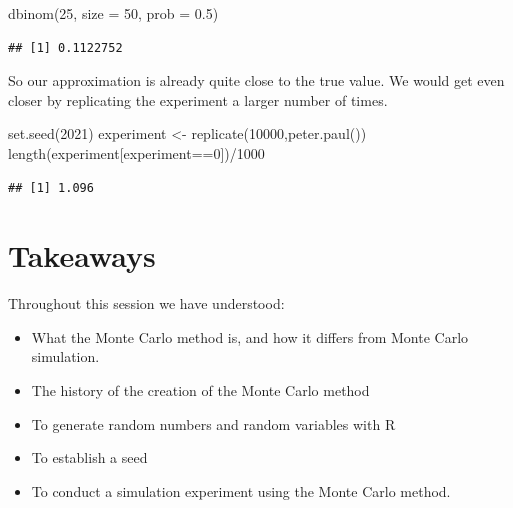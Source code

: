 \documentclass[
]{book}
\newenvironment{Shaded}{\begin{snugshade}}{\end{snugshade}}
\newcommand{\AttributeTok}[1]{\textcolor[rgb]{0.77,0.63,0.00}{#1}}
\newcommand{\DecValTok}[1]{\textcolor[rgb]{0.00,0.00,0.81}{#1}}
\newcommand{\FloatTok}[1]{\textcolor[rgb]{0.00,0.00,0.81}{#1}}
\newcommand{\FunctionTok}[1]{\textcolor[rgb]{0.00,0.00,0.00}{#1}}
\newcommand{\NormalTok}[1]{#1}
\newcommand{\OtherTok}[1]{\textcolor[rgb]{0.56,0.35,0.01}{#1}}
\newcommand{\SpecialCharTok}[1]{\textcolor[rgb]{0.00,0.00,0.00}{#1}}
\providecommand{\tightlist}{%
  \setlength{\itemsep}{0pt}\setlength{\parskip}{0pt}}
\theoremstyle{definition}
\theoremstyle{definition}
\theoremstyle{definition}
\theoremstyle{definition}
\theoremstyle{remark}
\begin{document}
\begin{Shaded}
\begin{Highlighting}[]
\FunctionTok{dbinom}\NormalTok{(}\DecValTok{25}\NormalTok{, }\AttributeTok{size =} \DecValTok{50}\NormalTok{, }\AttributeTok{prob =} \FloatTok{0.5}\NormalTok{)}
\end{Highlighting}
\end{Shaded}

\begin{verbatim}
## [1] 0.1122752
\end{verbatim}

So our approximation is already quite close to the true value. We would get even closer by replicating the experiment a larger number of times.

\begin{Shaded}
\begin{Highlighting}[]
\FunctionTok{set.seed}\NormalTok{(}\DecValTok{2021}\NormalTok{)}
\NormalTok{experiment }\OtherTok{\textless{}{-}} \FunctionTok{replicate}\NormalTok{(}\DecValTok{10000}\NormalTok{,}\FunctionTok{peter.paul}\NormalTok{())}
\FunctionTok{length}\NormalTok{(experiment[experiment}\SpecialCharTok{==}\DecValTok{0}\NormalTok{])}\SpecialCharTok{/}\DecValTok{1000}
\end{Highlighting}
\end{Shaded}

\begin{verbatim}
## [1] 1.096
\end{verbatim}

\hypertarget{takeaways}{%
\section{Takeaways}\label{takeaways}}

Throughout this session we have understood:

\begin{itemize}
\tightlist
\item
  What the Monte Carlo method is, and how it differs from Monte Carlo simulation.
\item
  The history of the creation of the Monte Carlo method
\item
  To generate random numbers and random variables with R
\item
  To establish a seed
\item
  To conduct a simulation experiment using the Monte Carlo method.
\end{itemize}
\end{document}
